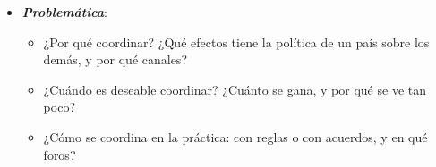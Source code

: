 \documentclass[11pt]{article}
\begin{document}
\begin{itemize}
\begin{itemize}
\begin{itemize}
    \item desde finales de los 90, la nueva macroeconomía abierta, con microfundamentos, volvió al escepticismo: las ganancias de coordinar son pequeñas\nocite{ObstfeldRogoff2002Global}. La crisis de 2008 devolvió la coordinación a la práctica, con el G-20.
    \end{itemize}
  \item \emph{La convención y el ejemplo}:
    \begin{itemize}
    \item el tipo de cambio $E$ es directo (unidades de moneda nacional por unidad de moneda extranjera), de modo que una subida es una depreciación ;
    \item la exposición sigue a 2~países grandes, A y B, los mismos en todos los modelos: A, la zona del euro, y B, Estados Unidos.
    \end{itemize}
  \end{itemize}

\item \textbf{\emph{Problemática}}:
  \begin{itemize}
  \item ¿Por qué coordinar? ¿Qué efectos tiene la política de un país sobre los demás, y por qué canales?
  \item ¿Cuándo es deseable coordinar? ¿Cuánto se gana, y por qué se ve tan poco?
  \item ¿Cómo se coordina en la práctica: con reglas o con acuerdos, y en qué foros?
  \end{itemize}


\end{itemize}
\end{document}
